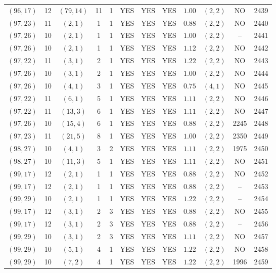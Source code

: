 \begin{longtable}{|c|c|c|c|c|c|c|c|c|c|c|c|}
$(96,17)$ & 12 & $(79,14)$ & 11 & 1 & YES & YES & YES & $1.00$ & $(2,2)$ & NO & 2439\\
$(97,23)$ & 11 & $(2,1)$ & 1 & 1 & YES & YES & YES & $0.88$ & $(2,2)$ & NO & 2440\\
$(97,26)$ & 10 & $(2,1)$ & 1 & 1 & YES & YES & YES & $1.00$ & $(2,2)$ & -- & 2441\\
$(97,26)$ & 10 & $(2,1)$ & 1 & 1 & YES & YES & YES & $1.12$ & $(2,2)$ & NO & 2442\\
$(97,22)$ & 11 & $(3,1)$ & 2 & 1 & YES & YES & YES & $1.22$ & $(2,2)$ & NO & 2443\\
$(97,26)$ & 10 & $(3,1)$ & 2 & 1 & YES & YES & YES & $1.00$ & $(2,2)$ & NO & 2444\\
$(97,26)$ & 10 & $(4,1)$ & 3 & 1 & YES & YES & YES & $0.75$ & $(4,1)$ & NO & 2445\\
$(97,22)$ & 11 & $(6,1)$ & 5 & 1 & YES & YES & YES & $1.11$ & $(2,2)$ & NO & 2446\\
$(97,22)$ & 11 & $(13,3)$ & 6 & 1 & YES & YES & YES & $1.11$ & $(2,2)$ & NO & 2447\\
$(97,26)$ & 10 & $(15,4)$ & 6 & 1 & YES & YES & YES & $0.88$ & $(2,2)$ & 2245 & 2448\\
$(97,23)$ & 11 & $(21,5)$ & 8 & 1 & YES & YES & YES & $1.00$ & $(2,2)$ & 2350 & 2449\\
$(98,27)$ & 10 & $(4,1)$ & 3 & 2 & YES & YES & YES & $1.11$ & $(2,2)$ & 1975 & 2450\\
$(98,27)$ & 10 & $(11,3)$ & 5 & 1 & YES & YES & YES & $1.11$ & $(2,2)$ & NO & 2451\\
$(99,17)$ & 12 & $(2,1)$ & 1 & 1 & YES & YES & YES & $0.88$ & $(2,2)$ & NO & 2452\\
$(99,17)$ & 12 & $(2,1)$ & 1 & 1 & YES & YES & YES & $0.88$ & $(2,2)$ & -- & 2453\\
$(99,29)$ & 10 & $(2,1)$ & 1 & 1 & YES & YES & YES & $1.22$ & $(2,2)$ & -- & 2454\\
$(99,17)$ & 12 & $(3,1)$ & 2 & 3 & YES & YES & YES & $0.88$ & $(2,2)$ & NO & 2455\\
$(99,17)$ & 12 & $(3,1)$ & 2 & 3 & YES & YES & YES & $0.88$ & $(2,2)$ & -- & 2456\\
$(99,29)$ & 10 & $(3,1)$ & 2 & 3 & YES & YES & YES & $1.11$ & $(2,2)$ & NO & 2457\\
$(99,29)$ & 10 & $(5,1)$ & 4 & 1 & YES & YES & YES & $1.22$ & $(2,2)$ & NO & 2458\\
$(99,29)$ & 10 & $(7,2)$ & 4 & 1 & YES & YES & YES & $1.22$ & $(2,2)$ & 1996 & 2459\\

\end{longtable}

